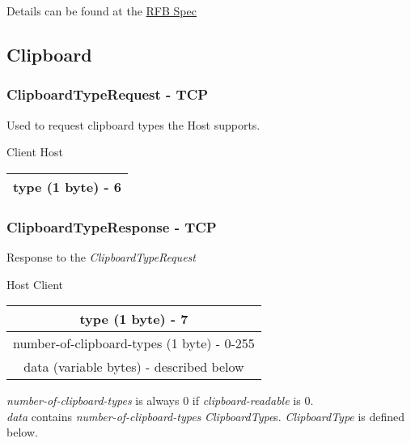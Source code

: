\documentclass{article}
\begin{document}
    Details can be found at the \href{https://github.com/rfbproto/rfbproto/blob/master/rfbproto.rst#keyevent}{RFB Spec}

    \subsection{Clipboard} %

    \subsubsection{ClipboardTypeRequest - TCP}

    Used to request clipboard types the Host supports.

    \begin{center}
        Client \textrightarrow Host\\
        \begin{tabular}{|c|}
            \hline
            type (1 byte) - 6 \\
            \hline
        \end{tabular}
    \end{center}

    \subsubsection{ClipboardTypeResponse - TCP}

    Response to the \emph{ClipboardTypeRequest}

    \begin{center}
        Host \textrightarrow Client\\
        \begin{tabular}{|c|}
            \hline
            type (1 byte) - 7                          \\
            \hline
            number-of-clipboard-types (1 byte) - 0-255 \\
            \hline
            data (variable bytes) - described below    \\
            \hline
        \end{tabular}
    \end{center}

    \emph{number-of-clipboard-types} is always 0 if \emph{clipboard-readable} is 0.\\

    \emph{data} contains \emph{number-of-clipboard-types} \emph{ClipboardType}s. \emph{ClipboardType} is defined below.
\end{document}
